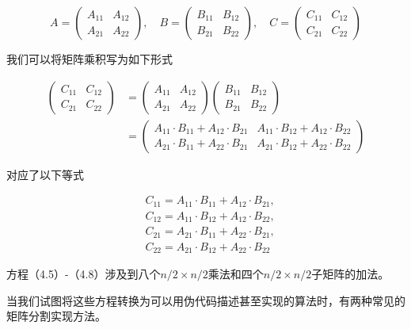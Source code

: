\documentclass[lang=cn,newtx,10pt,scheme=chinese]{elegantbook}
\begin{document}
$$
A=\left(\begin{array}{ll}
A_{11} & A_{12} \\
A_{21} & A_{22}
\end{array}\right), \quad B=\left(\begin{array}{ll}
B_{11} & B_{12} \\
B_{21} & B_{22}
\end{array}\right), \quad C=\left(\begin{array}{ll}
C_{11} & C_{12} \\
C_{21} & C_{22}
\end{array}\right)
$$

我们可以将矩阵乘积写为如下形式

$$
\begin{aligned}
\left(\begin{array}{ll}
C_{11} & C_{12} \\
C_{21} & C_{22}
\end{array}\right) & =\left(\begin{array}{ll}
A_{11} & A_{12} \\
A_{21} & A_{22}
\end{array}\right)\left(\begin{array}{ll}
B_{11} & B_{12} \\
B_{21} & B_{22}
\end{array}\right) \\
& =\left(\begin{array}{ll}
A_{11} \cdot B_{11}+A_{12} \cdot B_{21} & A_{11} \cdot B_{12}+A_{12} \cdot B_{22} \\
A_{21} \cdot B_{11}+A_{22} \cdot B_{21} & A_{21} \cdot B_{12}+A_{22} \cdot B_{22}
\end{array}\right)
\end{aligned}
$$

对应了以下等式

$$
\begin{aligned}
& C_{11}=A_{11} \cdot B_{11}+A_{12} \cdot B_{21}, \\
& C_{12}=A_{11} \cdot B_{12}+A_{12} \cdot B_{22}, \\
& C_{21}=A_{21} \cdot B_{11}+A_{22} \cdot B_{21}, \\
& C_{22}=A_{21} \cdot B_{12}+A_{22} \cdot B_{22}
\end{aligned}
$$

方程（4.5）-（4.8）涉及到八个$n / 2 \times n / 2$乘法和四个$n / 2 \times n / 2$子矩阵的加法。

当我们试图将这些方程转换为可以用伪代码描述甚至实现的算法时，有两种常见的矩阵分割实现方法。
\end{document}
